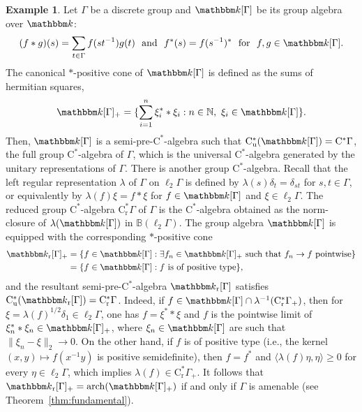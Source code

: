 \documentclass[12pt]{amsart}
\theoremstyle{definition}
\newtheorem{exa}{Example}
\begin{document}
\begin{exa}\label{exa:grpalg}
Let ${\Gamma}$ be a discrete group and ${{\mathbbm k}}[{\Gamma}]$ be its group algebra over ${{\mathbbm k}}$:
\[
(f*g)(s)=\sum_{t\in{\Gamma}} f(st^{-1})g(t)
\ \mbox{ and }\
f^*(s)=f(s^{-1})^*
\ \mbox{ for }\
f,g\in{{\mathbbm k}}[{\Gamma}].
\]
The canonical $*$-positive cone of ${{\mathbbm k}}[{\Gamma}]$ is defined as the sums of hermitian squares,
\[
{{\mathbbm k}}[{\Gamma}]_+=\{ \sum_{i=1}^n \xi_i^**\xi_i : n\in{{\mathbb N}},\ \xi_i\in {{\mathbbm k}}[{\Gamma}]\}.
\]
Then, ${{\mathbbm k}}[{\Gamma}]$ is a {semi-pre-$\mathrm{C}^*$-alge\-bra\xspace} such that $\mathrm{C}^*_{\mathrm{u}}({{\mathbbm k}}[{\Gamma}])=\mathrm{C}^*{\Gamma}$, the full group {$\mathrm{C}^*$-alge\-bra\xspace} of ${\Gamma}$,
which is the universal {$\mathrm{C}^*$-alge\-bra\xspace} generated by the unitary representations of ${\Gamma}$.
There is another group {$\mathrm{C}^*$-alge\-bra\xspace}.
Recall that the left regular representation $\lambda$ of ${\Gamma}$ on $\ell_2{\Gamma}$ is defined by
$\lambda(s)\delta_t=\delta_{st}$ for $s,t\in{\Gamma}$, or equivalently by $\lambda(f)\xi=f*\xi$ for
$f\in{{\mathbbm k}}[{\Gamma}]$ and $\xi\in\ell_2{\Gamma}$. The reduced group {$\mathrm{C}^*$-alge\-bra\xspace} $\mathrm{C}^*_{\mathrm{r}}{\Gamma}$ of ${\Gamma}$ is
the {$\mathrm{C}^*$-alge\-bra\xspace} obtained as the norm-closure of $\lambda({{\mathbbm k}}[{\Gamma}])$ in ${{\mathbb B}}(\ell_2{\Gamma})$.
The group algebra ${{\mathbbm k}}[{\Gamma}]$ is equipped with the corresponding $*$-positive cone
\begin{align*}
{{\mathbbm k}}_{\mathrm{r}}[{\Gamma}]_+
 &=\{ f\in{{\mathbbm k}}[{\Gamma}] : \exists f_n\in{{\mathbbm k}}[{\Gamma}]_+\mbox{ such that }f_n\to f\mbox{ pointwise}\}\\
 &=\{ f\in{{\mathbbm k}}[{\Gamma}] : \mbox{$f$ is of positive type}\},
\end{align*}
and the resultant {semi-pre-$\mathrm{C}^*$-alge\-bra\xspace} ${{\mathbbm k}}_{\mathrm{r}}[{\Gamma}]$ satisfies
$\mathrm{C}^*_{\mathrm{u}}({{\mathbbm k}}_{\mathrm{r}}[{\Gamma}])=\mathrm{C}^*_{\mathrm{r}}{\Gamma}$.
Indeed, if $f\in {{\mathbbm k}}[{\Gamma}]\cap\lambda^{-1}(\mathrm{C}^*_{\mathrm{r}}{\Gamma}_+)$, then for
$\xi=\lambda(f)^{1/2}\delta_1\in\ell_2{\Gamma}$, one has $f=\xi^**\xi$ and
$f$ is the pointwise limit of $\xi_n^**\xi_n \in {{\mathbbm k}}[{\Gamma}]_+$,
where $\xi_n\in{{\mathbbm k}}[{\Gamma}]$ are such that $\|\xi_n-\xi\|_2\to0$.
On the other hand, if $f$ is of positive type (i.e., the kernel $(x,y)\mapsto f(x^{-1}y)$ is positive semidefinite),
then $f=f^*$ and ${\mathopen{\langle}{\lambda(f)\eta,\eta}\mathclose{\rangle}}\geq0$ for every $\eta\in\ell_2{\Gamma}$,
which implies $\lambda(f)\in\mathrm{C}^*_{\mathrm{r}}{\Gamma}_+$.
It follows that ${{\mathbbm k}}_{\mathrm{r}}[{\Gamma}]_+=\operatorname*{arch}({{\mathbbm k}}[{\Gamma}]_+)$ if and only if ${\Gamma}$ is amenable
(see Theorem~\ref{thm:fundamental}).
\end{exa}
\end{document}

